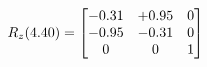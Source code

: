 \documentclass[preview]{standalone}
\begin{document}
\begin{align*}
\special{dvisvgm:raw <g id='unique000'>}R_{z}(4.40) = \begin{bmatrix}-0.31 & +0.95 & 0 \\-0.95 & -0.31 & 0 \\0 & 0 & 1\end{bmatrix}\special{dvisvgm:raw </g>}
\end{align*}
\end{document}
